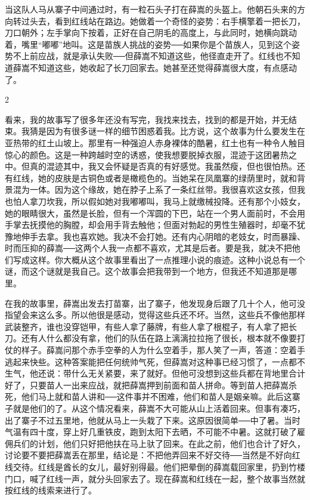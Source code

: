 当这队人马从寨子中间通过时，有一粒石头子打在薛嵩的头盔上。他朝石头来的方向转过头去，看到红线站在路边。她做着一个奇怪的姿势：右手横擎着一把长刀，刀口朝外；左手掌向下按着，正好在自己阴毛的高度上，与此同时，她横向跳动着，嘴里“嘟嘟”地叫。这是苗族人挑战的姿势──如果你是个苗族人，见到这个姿势不上前应战，就是承认失败──但薛嵩不知道这些，他径直走开了。红线也不知道薛嵩不知道这些，她收起了长刀回家去。她甚至还觉得薛嵩很大度，有点感动了。 

2 

看来，我的故事写了很多年还没有写完，我找来找去，找到的都是开始，并无结束。我猜是因为有很多谜一样的细节困惑着我。比方说，这个故事为什么要发生在亚热带的红土山坡上。那里有一种强迫人赤身裸体的酷暑，红土也有一种令人触目惊心的颜色。这是一种跨越时空的诱惑，使我想要脱掉衣服，混迹于这团暑热之中。但真的混迹其中，我又会怀疑是否真的有好感觉。我虽然瘦，但也很怕热。还有红线，她的皮肤是古铜色或者是橄榄色的。当她呆在凤凰寨的绿荫里时，就和背景混为一体。因为这个缘故，她在脖子上系了一条红丝带。我很喜欢这女孩，但我也怕人拿刀坎我，所以假如她对我嘟嘟叫，我马上就缴械投降。还有那个小妓女，她的眼睛很大，虽然是长脸，但有一个浑圆的下巴，站在一个男人面前时，不会用手掌去抚摸他的胸膛，却会用手背去触他；但面对勃起的男性生殖器时，却毫不犹豫地伸手去拿。我也喜欢她。我决不会打她。还有内心阴暗的老妓女，时而暴躁、时而压抑的薛嵩──这两个人我一点都不喜欢，尤其是后者。要是我，就决不把他们写成这样。你大概从这个故事里看出了一点推理小说的痕迹。这种小说总有一个谜，而这个谜就是我自己。这个故事会把我带到一个地方，但我还不知道那是哪里。 

在我的故事里，薛嵩出发去打苗寨，出了寨子，他发现身后跟了几十个人，他可没指望会来这么多。所以他很是感动，觉得这些兵还不坏。当然，这些兵不像他那样武装整齐，谁也没穿铠甲，有些人拿了藤牌，有些人拿了根棍子，有人拿了把长刀。还有人什么都没有拿，他们的队伍在路上漓漓拉拉拖了很长，根本就不像要打仗的样子。薛嵩问那个赤手空拳的人为什么空着手，那人笑了一声，答道：空着手逃起来快些。这种答案能把任何统帅气死，但薛嵩对这种事已经习惯了，一点都不生气，他还说：带什么无关紧要，来了就好。但他可没想到这些兵都在背地里合计好了，只要苗人一出来应战，就把薛嵩押到前面和苗人拼命。等到苗人把薛嵩杀死，他们马上就和苗人讲和──这件事并不困难，他们和苗人是姻亲嘛。此后这寨子就是他们的了。从这个情况看来，薛嵩不大可能从山上活着回来。但事有凑巧，出了寨子不过五里地，他就从马上一头栽了下来。这原因很简单──中了暑。当时气温有四十度，穿上好几重铁皮，跑到太阳下去晒，不可能不中暑。这就打破了雇佣兵们的计划，他们只好把他扶在马上驮了回来。在此之前，他们也合计了好久，讨论要不要把薛嵩丢在那里，结论是：不把他弄回来不好交待──当然是不好向红线交待。红线是酋长的女儿，最好别得最。他们把晕倒的薛嵩载回家里，扔到竹楼门口，喊了红线一声，就分头回家去了。现在薛嵩和红线在一起，整个故事当然就按红线的线索来进行了。 

